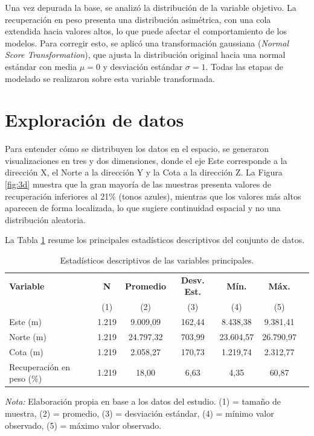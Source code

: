 \documentclass[12pt,letterpaper]{article}
\begin{document}
	Una vez depurada la base, se analizó la distribución de la variable objetivo. La recuperación en peso presenta una distribución asimétrica, con una cola extendida hacia valores altos, lo que puede afectar el comportamiento de los modelos. Para corregir esto, se aplicó una transformación gaussiana (\textit{Normal Score Transformation}), que ajusta la distribución original hacia una normal estándar con media $\mu = 0$ y desviación estándar $\sigma = 1$. Todas las etapas de modelado se realizaron sobre esta variable transformada.
	
\section{Exploración de datos}

Para entender cómo se distribuyen los datos en el espacio, se generaron 
visualizaciones en tres y dos dimensiones, donde el eje Este corresponde a la 
dirección X, el Norte a la dirección Y y la Cota a la dirección Z. La Figura 
\ref{fig:3d} muestra que la gran mayoría de las muestras presenta valores de 
recuperación inferiores al 21\% (tonos azules), mientras que los valores más altos 
aparecen de forma localizada, lo que sugiere continuidad espacial y no una 
distribución aleatoria.

La Tabla \ref{tab:descriptivos} resume los principales estadísticos descriptivos 
del conjunto de datos.

\begin{table}[h]
	\centering
	\caption{Estadísticos descriptivos de las variables principales.}
	\begin{tabular}{lcccccc}
		\hline
		\textbf{Variable} & \textbf{N} & \textbf{Promedio} & \textbf{Desv. Est.} & 
		\textbf{Mín.} & \textbf{Máx.} \\
		& (1) & (2) & (3) & (4) & (5) \\
		\hline
		Este (m)                  & 1.219 & 9.009,09  & 162,44 & 8.438,38  & 9.381,41  \\
		Norte (m)                 & 1.219 & 24.797,32 & 703,99 & 23.604,57 & 26.790,97 \\
		Cota (m)                  & 1.219 & 2.058,27  & 170,73 & 1.219,74  & 2.312,77  \\
		Recuperación en peso (\%) & 1.219 & 18,00     & 6,63   & 4,35      & 60,87     \\
		\hline
	\end{tabular}
	\begin{flushleft}
		\small \textit{Nota:} Elaboración propia en base a los datos del estudio. 
		(1) = tamaño de muestra, (2) = promedio, (3) = desviación estándar, 
		(4) = mínimo valor observado, (5) = máximo valor observado.
	\end{flushleft}
	\label{tab:descriptivos}
\end{table}
\end{document}

